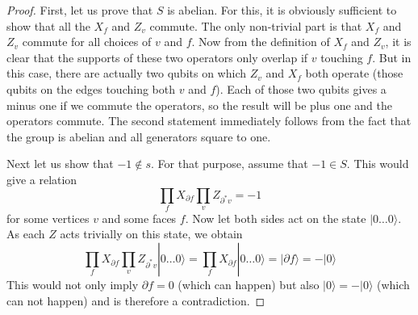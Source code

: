\documentclass[a4paper, draft]{article}
\theoremstyle{own}
\theoremstyle{remark}
\begin{document}
\begin{proof}
First, let us prove that $S$ is abelian. For this, it is obviously sufficient to show that all the $X_f$ and $Z_v$ commute. The only non-trivial part is that $X_f$ and $Z_v$ commute for all choices of $v$ and $f$. Now from the definition of $X_f$ and $Z_v$, it is clear that the supports of these two operators only overlap if $v$ touching $f$. But in this case, there are actually two qubits on which $Z_v$ and $X_f$ both operate (those qubits on the edges touching both $v$ and $f$). Each of those two qubits gives a minus one if we commute the operators, so the result will be plus one and the operators commute. The second statement immediately follows from the fact that the group is abelian and all generators square to one.

Next let us show that $-1 \notin s$. For that purpose, assume that $-1 \in S$. This would give a relation
$$
\prod_f X_{\partial f} \prod_v Z_{\partial^* v} = - 1
$$
for some vertices $v$ and some faces $f$. Now let both sides act on the state $| 0 \dots 0 \rangle$. As each $Z$ acts trivially on this state, we obtain
$$
\prod_f X_{\partial f} \prod_v Z_{\partial^* v} |0 \dots 0 \rangle 
= \prod_f X_{\partial f}  |0 \dots 0 \rangle = |\partial f \rangle = - |0 \rangle
$$
This would not only imply $\partial f = 0$ (which can happen) but also $| 0 \rangle = - |0 \rangle$ (which can not happen) and is therefore a contradiction. 


\end{proof}
\end{document}
